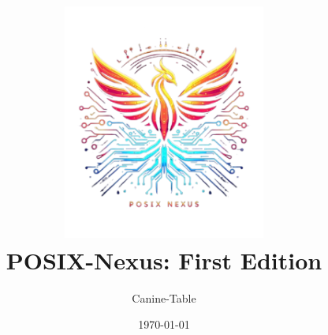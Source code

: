 \documentclass[../posix-nexus.tex]{subfiles}
\begin{document}
    \title{
        \includegraphics[width=0.5\textwidth]{setup/images/posix-nexus-icon.png}\\[1cm]
        \textbf{POSIX-Nexus}: First Edition
    }
    \author{Canine-Table}
    \date{\today}
    \maketitle
\end{document}
